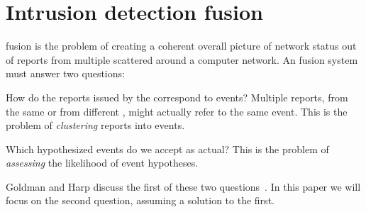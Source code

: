 \section{Intrusion detection fusion}
\label{sec:ids-fusion}
{\ids} fusion %
is the
problem of creating a
coherent overall picture of network status out of reports from multiple
{\idses} scattered around a computer network. %
An \ids fusion system must answer two questions:
\begin{compactenum}
\item How do the reports issued by the \idses correspond to events? Multiple
  reports, from the same \ids or from different \idses,  might
  actually refer to the same event. This is the problem of \emph{clustering}
  reports into events.
\item Which hypothesized events do we accept as actual?  This is the problem of
  \emph{assessing} the likelihood of event hypotheses.
\end{compactenum}
Goldman and Harp discuss the first of these two
questions~.  In this paper we will
focus on the second question, assuming a solution to the first.

